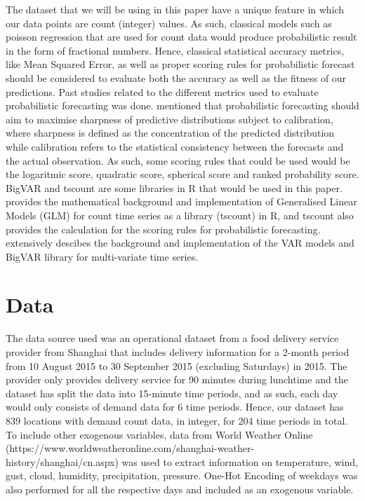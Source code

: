 \documentclass[nonblindrev,msom]{informs3} %
\begin{document}
\noindent The dataset that we will be using in this paper have a unique feature in which our data points are count (integer) values. As such, classical models such as poisson regression that are used for count data would produce probabilistic result in the form of fractional numbers. Hence, classical statistical accuracy metrics, like Mean Squared Error, as well as proper scoring rules for probabilistic forecast should be considered to evaluate both the accuracy as well as the fitness of our predictions. Past studies related to the different metrics used to evaluate probabilistic forecasting was done. \cite{Czado2009PredictiveMA} mentioned that probabilistic forecasting should aim to maximise sharpness of predictive distributions subject to calibration, where sharpness is defined as the concentration of the predicted distribution while calibration refers to the statistical consistency between the forecasts and the actual observation. As such, some scoring rules that could be used would be the logaritmic score, quadratic score, spherical score and ranked probability score. \\

\noindent BigVAR and tscount are some libraries in R that would be used in this paper. \cite{Tobias2017} provides the mathematical background and implementation of Generalised Linear Models (GLM) for count time series as a library (tscount) in R, and tscount also provides the calculation for the scoring rules for probabilistic forecasting. \cite{William2017} extensively descibes the background and implementation of the VAR models and BigVAR library for multi-variate time series. 


\section{Data}
The data source used was an operational dataset from a food delivery service provider from Shanghai that includes delivery information for a 2-month period from 10 August 2015 to 30 September 2015 (excluding Saturdays) in 2015. The provider only provides delivery service for 90 minutes during lunchtime and the dataset has split the data into 15-minute time periods, and as such, each day would only consists of demand data for 6 time periods. Hence, our dataset has 839 locations with demand count data, in integer, for 204 time periods in total. \\

\noindent To include other exogenous variables, data from World Weather Online (https://www.worldweatheronline.com/shanghai-weather-history/shanghai/cn.aspx) was used to extract information on temperature, wind, gust, cloud, humidity, precipitation, pressure. One-Hot Encoding of weekdays was also performed for all the respective days and included as an exogenous variable. \\
\end{document}
